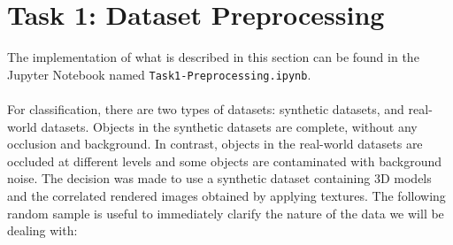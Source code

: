 \documentclass[11pt,a4paper]{article}
\begin{document}
\newpage
\section{Task 1: Dataset Preprocessing}
\label{section:dataset-preprocessing}
The implementation of what is described in this section can be found in the Jupyter Notebook named \texttt{Task1-Preprocessing.ipynb}.\\
\\
For classification, there are two types of datasets: synthetic datasets, and real-world datasets. Objects in the synthetic datasets are complete, without any occlusion and background. In contrast, objects in the real-world datasets are occluded at different levels and some objects are contaminated with background noise. The decision was made to use a synthetic dataset containing 3D models and the correlated rendered images obtained by applying textures. The following random sample is useful to immediately clarify the nature of the data we will be dealing with:
\end{document}
